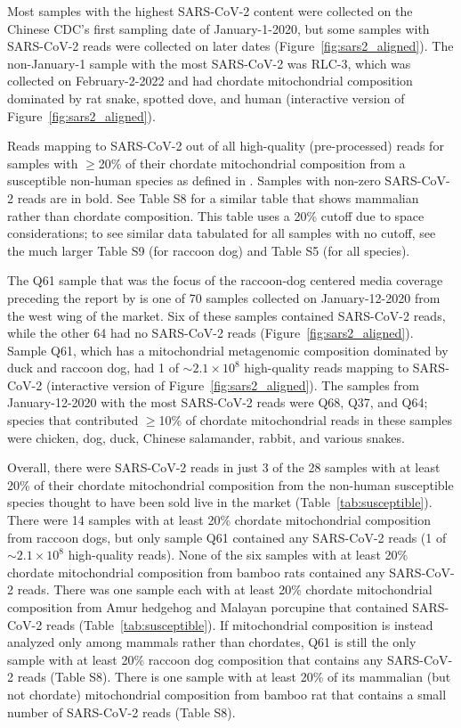 \documentclass[9pt,twocolumn,twoside]{gsajnl_modified}
\begin{document}
Most samples with the highest SARS-CoV-2 content were collected on the Chinese CDC's first sampling date of January-1-2020, but some samples with SARS-CoV-2 reads were collected on later dates (Figure~\ref{fig:sars2_aligned}).
The non-January-1 sample with the most SARS-CoV-2 was RLC-3, which was collected on February-2-2022 and had chordate mitochondrial composition dominated by rat snake, spotted dove, and human (interactive version of Figure~\ref{fig:sars2_aligned}).

\begin{table}
\caption{
Reads mapping to SARS-CoV-2 out of all high-quality (pre-processed) reads for samples with $\ge$20\% of their chordate mitochondrial composition from a susceptible non-human species as defined in \citet{crits2023genetic}.
Samples with non-zero SARS-CoV-2 reads are in bold.
See Table S8 for a similar table that shows mammalian rather than chordate composition.
This table uses a 20\% cutoff due to space considerations; to see similar data tabulated for all samples with no cutoff, see the much larger Table S9 (for raccoon dog) and Table S5 (for all species).
\label{tab:susceptible}
}
\end{table}


The Q61 sample that was the focus of the raccoon-dog centered media coverage~\citep{wu2023atlantic,mueller2023nytimes} preceding the report by \citet{crits2023genetic} is one of 70 samples collected on January-12-2020 from the west wing of the market.
Six of these samples contained SARS-CoV-2 reads, while the other 64 had no SARS-CoV-2 reads (Figure~\ref{fig:sars2_aligned}).
Sample Q61, which has a mitochondrial metagenomic composition dominated by duck and raccoon dog, had 1 of $\sim2.1 \times 10^8$ high-quality reads mapping to SARS-CoV-2 (interactive version of Figure~\ref{fig:sars2_aligned}).
The samples from January-12-2020 with the most SARS-CoV-2 reads were Q68, Q37, and Q64; species that contributed $\ge$10\% of chordate mitochondrial reads in these samples were chicken, dog, duck, Chinese salamander, rabbit, and various snakes.

 Overall, there were SARS-CoV-2 reads in just 3 of the 28 samples with at least 20\% of their chordate mitochondrial composition from the non-human susceptible species thought to have been sold live in the market (Table~\ref{tab:susceptible}).
There were 14 samples with at least 20\% chordate mitochondrial composition from raccoon dogs, but only sample Q61 contained any SARS-CoV-2 reads (1 of $\sim2.1 \times 10^8$ high-quality reads).
None of the six samples with at least 20\% chordate mitochondrial composition from bamboo rats contained any SARS-CoV-2 reads.
There was one sample each with at least 20\% chordate mitochondrial composition from Amur hedgehog and Malayan porcupine that contained SARS-CoV-2 reads (Table~\ref{tab:susceptible}).
If mitochondrial composition is instead analyzed only among mammals rather than chordates, Q61 is still the only sample with at least 20\% raccoon dog composition that contains any SARS-CoV-2 reads (Table S8).
There is one sample with at least 20\% of its mammalian (but not chordate) mitochondrial composition from bamboo rat that contains a small number of SARS-CoV-2 reads (Table S8).
\end{document}
